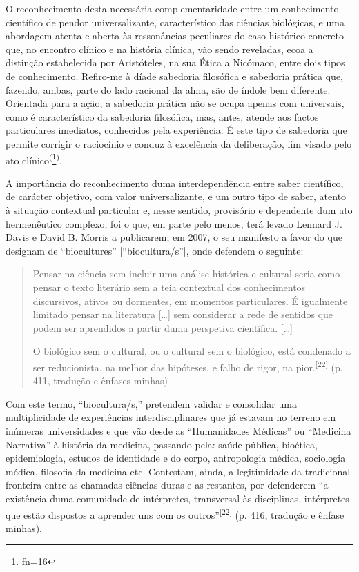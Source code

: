 \documentclass{article}
\makeatletter
\newcommand{\fn}{\afterassignment\fn@aux\count0=}
\newcommand{\fn@aux}{\csname fn\the\count0\endcsname}
\makeatother
\begin{document}
O reconhecimento desta necessária complementaridade entre um conhecimento
científico de pendor universalizante, característico das ciências biológicas, e
uma abordagem atenta e aberta às ressonâncias peculiares do caso histórico
concreto que, no encontro clínico e na história clínica, vão sendo reveladas,
ecoa a distinção estabelecida por Aristóteles, na sua Ética a Nicómaco, entre
dois tipos de conhecimento. Refiro-me à díade sabedoria filosófica e sabedoria
prática que, fazendo, ambas, parte do lado racional da alma, são de índole bem
diferente. Orientada para a ação, a sabedoria prática não se ocupa apenas com
universais, como é característico da sabedoria filosófica, mas, antes, atende
aos factos particulares imediatos, conhecidos pela experiência. É este tipo de
sabedoria que permite corrigir o raciocínio e conduz à excelência da
deliberação, fim visado pelo ato clínico\textsuperscript{(}\footnote{\fn16}\textsuperscript{)}.

A importância do reconhecimento duma interdependência entre saber científico, de
carácter objetivo, com valor universalizante, e um outro tipo de saber, atento à
situação contextual particular e, nesse sentido, provisório e dependente dum ato
hermenêutico complexo, foi o que, em parte pelo menos, terá levado Lennard J.
Davis e David B. Morris a publicarem, em 2007, o seu manifesto a favor do que
designam de “biocultures” [“biocultura/s”], onde defendem o seguinte:
\begin{quote}

Pensar na ciência sem incluir uma análise histórica e cultural seria como pensar
o texto literário sem a teia contextual dos conhecimentos discursivos, ativos ou
dormentes, em momentos particulares. É igualmente limitado pensar na literatura
[…] sem considerar a rede de sentidos que podem ser aprendidos a partir duma
perspetiva científica. […]

O biológico sem o cultural, ou o cultural sem o biológico, está condenado a ser
reducionista, na melhor das hipóteses, e falho de rigor, na
pior.\textsuperscript{[}\textsuperscript{22}\textsuperscript{]}
(p. 411, tradução e ênfases minhas)

\end{quote}

Com este termo, “biocultura/s,” pretendem validar e consolidar uma
multiplicidade de experiências interdisciplinares que já estavam no terreno em
inúmeras universidades e que vão desde as “Humanidades Médicas” ou “Medicina
Narrativa” à história da medicina, passando pela: saúde pública, bioética,
epidemiologia, estudos de identidade e do corpo, antropologia médica, sociologia
médica, filosofia da medicina etc. Contestam, ainda, a legitimidade da
tradicional fronteira entre as chamadas ciências duras e as restantes, por
defenderem “a existência duma comunidade de intérpretes, transversal às
disciplinas, intérpretes que estão dispostos a aprender uns com os
outros”\textsuperscript{[}\textsuperscript{22}\textsuperscript{]}
(p. 416, tradução e ênfase minhas).
\end{document}
